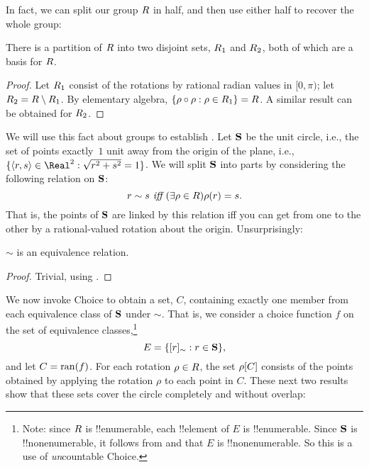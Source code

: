 \documentclass[../../../include/open-logic-section]{subfiles}
\begin{document}
In fact, we can split our group $R$
in half, and then use either half to recover the whole group:

\begin{lem}
There is a partition of $R$ into two disjoint sets,
$R_{1}$ and $R_{2}$, both of which are a
basis for $R$. 
\end{lem}

\begin{proof}
Let $R_{1}$ consist of the rotations by rational radian
values in $[0, \pi)$; let $R_{2} = R
\setminus R_1$. By elementary algebra,
$\{ \rho \circ \rho : \rho \in R_1 \} =
R$. A similar result can be obtained for
$R_2$.
\end{proof}

We will use this fact about groups to establish .
Let $\mathbf{S}$ be the unit circle, i.e., the set of points
exactly~$1$ unit away from the origin of the plane, i.e.,
$\Setabs{\tuple{r,s} \in \Real^2}{\sqrt{r^2+s^2}=1}$. We will split
$\mathbf{S}$ into parts by considering the following relation on
$\mathbf{S}$:
\[
	r \sim s \emph{ iff }(\exists \rho \in R)\rho(r) = s.
\]
That is, the points of $\mathbf{S}$ are linked by this relation iff you can get from one to the other by a rational-valued rotation about the origin. Unsurprisingly:

\begin{lem}
$\sim$ is an equivalence relation.
\end{lem}

\begin{proof}
Trivial, using . 
\end{proof}

We now invoke Choice to obtain a set, $C$, containing exactly one
member from each equivalence class of $\mathbf{S}$ under $\sim$. That
is, we consider a choice function $f$ on the set of equivalence
classes,\footnote{Note: since $R$ is !!{enumerable},
each !!{element} of $E$ is !!{enumerable}. Since $\mathbf{S}$ is
!!{nonenumerable}, it follows from  and
 that $E$ is
!!{nonenumerable}. So this is a use of \emph{un}countable Choice.}
\[
	E = \{ [r]_{\sim} : r \in \mathbf{S} \},
\]
and let $C = \mathrm{ran}(f)$. For each rotation $\rho \in R$,
the set $\rho[C]$ consists of the points obtained by
applying the rotation $\rho$ to each point in $C$. These next two
results show that these sets cover the circle completely and without
overlap:
\end{document}
